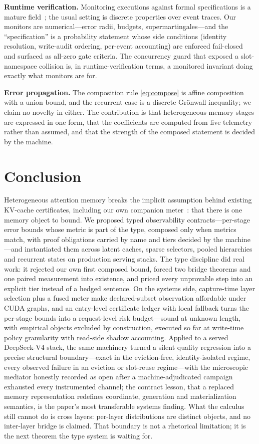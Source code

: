 \documentclass[11pt]{article}
\begin{document}
\textbf{Runtime verification.} Monitoring executions against formal
specifications is a mature field~\cite{leucker-rv}; the usual setting is
discrete properties over event traces. Our monitors are numerical---error
radii, budgets, supermartingales---and the ``specification'' is a probability
statement whose side conditions (identity resolution, write-audit ordering,
per-event accounting) are enforced fail-closed and surfaced as all-zero gate
criteria. The concurrency guard that exposed a slot-namespace collision is,
in runtime-verification terms, a monitored invariant doing exactly what
monitors are for.

\textbf{Error propagation.} The composition rule \eqref{eq:compose} is affine
composition with a union bound, and the recurrent case is a discrete Gr\"onwall
inequality; we claim no novelty in either. The contribution is that heterogeneous
memory stages are expressed in one form, that the coefficients are computed from
live telemetry rather than assumed, and that the strength of the composed statement
is decided by the machine.

\section{Conclusion}
Heterogeneous attention memory breaks the implicit assumption behind existing
KV-cache certificates, including our own companion meter~\cite{witcert-companion}: that
there is one memory object to bound. We proposed typed
observability contracts---per-stage error bounds whose metric is part of the type,
composed only when metrics match, with proof obligations carried by name and tiers
decided by the machine---and instantiated them across latent caches, sparse
selectors, pooled hierarchies and recurrent states on production serving stacks.
The type discipline did real work: it rejected our own first composed bound, forced
two bridge theorems and one paired measurement into existence, and priced every
unprovable step into an explicit tier instead of a hedged sentence. On the systems
side, capture-time layer selection plus a fused meter make declared-subset
observation affordable under CUDA graphs, and an entry-level certificate ledger
with local fallback turns the per-stage bounds into a request-level
risk budget---sound at unknown length, with empirical objects excluded by
construction, executed so far at write-time policy granularity with read-side
shadow accounting. Applied to a served DeepSeek-V4 stack, the same machinery turned a silent
quality regression into a precise structural boundary---exact in the
eviction-free, identity-isolated regime, every observed failure in an
eviction or slot-reuse regime---with the microscopic mediator honestly recorded as open after
a machine-adjudicated campaign exhausted every instrumented channel; the
contract lesson, that a replaced memory representation redefines
coordinate, generation and materialization semantics, is the paper's most
transferable systems finding. What the calculus still cannot do is cross
layers: per-layer distributions are distinct objects, and no inter-layer
bridge is claimed. That boundary is not a rhetorical limitation; it is the
next theorem the type system is waiting for.
\end{document}
